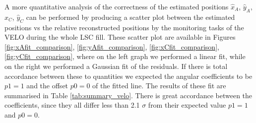 A more quantitative analysis of the correctness of the estimated positions $\hat{x}_A$, $\hat{y}_{A}$, $\hat{x}_C$, $\hat{y}_C$ can be performed by producing a scatter plot between the estimated positions vs the relative reconstructed positions by the monitoring tasks of the VELO during the whole LSC fill. These scatter plot are available in Figures \ref{fig:xAfit_comparison}, \ref{fig:yAfit_comparison}, \ref{fig:xCfit_comparison}, \ref{fig:yCfit_comparison}, where on the left graph we performed a linear fit, while on the right we performed a Gaussian fit of the residuals. If there is total accordance between these to quantities we expected the angular coefficients to be $p1=1$ and the offset $p0=0$ of the fitted line. 
The results of these fit are summarised in Table \ref{tab:summary_velo}. There is great accordance between the coefficients, since they all differ less than 2.1 $\sigma$ from their expected value $p1=1$ and $p0=0$. 


